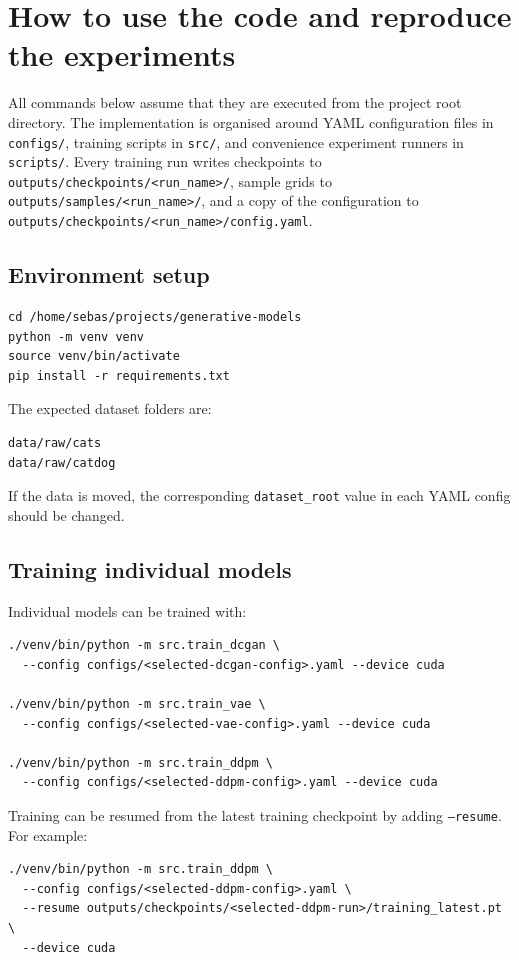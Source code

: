 \documentclass[11pt,a4paper]{article}
\begin{document}
\section{How to use the code and reproduce the experiments}

All commands below assume that they are executed from the project root directory.
The implementation is organised around YAML configuration files in \texttt{configs/}, training scripts in \texttt{src/}, and convenience experiment runners in \texttt{scripts/}.
Every training run writes checkpoints to \texttt{outputs/checkpoints/<run\_name>/}, sample grids to \texttt{outputs/samples/<run\_name>/}, and a copy of the configuration to \texttt{outputs/checkpoints/<run\_name>/config.yaml}.

\subsection{Environment setup}

\begin{verbatim}
cd /home/sebas/projects/generative-models
python -m venv venv
source venv/bin/activate
pip install -r requirements.txt
\end{verbatim}

The expected dataset folders are:
\begin{verbatim}
data/raw/cats
data/raw/catdog
\end{verbatim}
If the data is moved, the corresponding \texttt{dataset\_root} value in each YAML config should be changed.

\subsection{Training individual models}

Individual models can be trained with:
\begin{verbatim}
./venv/bin/python -m src.train_dcgan \
  --config configs/<selected-dcgan-config>.yaml --device cuda

./venv/bin/python -m src.train_vae \
  --config configs/<selected-vae-config>.yaml --device cuda

./venv/bin/python -m src.train_ddpm \
  --config configs/<selected-ddpm-config>.yaml --device cuda
\end{verbatim}

Training can be resumed from the latest training checkpoint by adding \texttt{--resume}.
For example:
\begin{verbatim}
./venv/bin/python -m src.train_ddpm \
  --config configs/<selected-ddpm-config>.yaml \
  --resume outputs/checkpoints/<selected-ddpm-run>/training_latest.pt \
  --device cuda
\end{verbatim}
\end{document}
